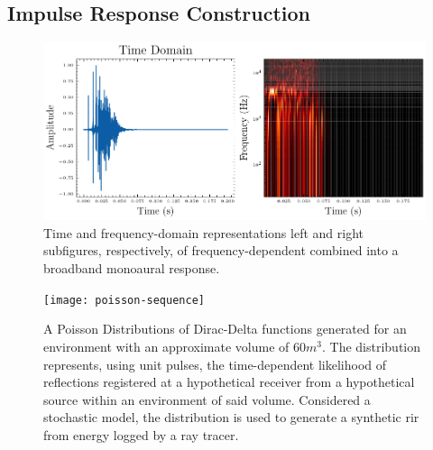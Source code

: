\subsection{Impulse Response Construction}
\begin{figure}[htbp]
    \centering
    \includegraphics[width=1\linewidth]{rir-rt-final}
    \caption{Time and frequency-domain representations left and right subfigures, respectively, of frequency-dependent  combined into a broadband monoaural response. }
    \label{fig:rir-freqdep-monoaural}
\end{figure}

\begin{figure}[htbp]
    \centering
    \texttt{[image: poisson-sequence]}
    \caption{A Poisson Distributions of Dirac-Delta functions generated for an environment with an approximate volume of $60m^3$. The distribution represents, using unit pulses, the time-dependent likelihood of reflections registered at a hypothetical receiver from a hypothetical source within an environment of said volume. Considered a stochastic model, the distribution is used to generate a synthetic \acrshort{rir} from energy logged by a ray tracer.}
    \label{fig:poisson-sequence}
\end{figure}

